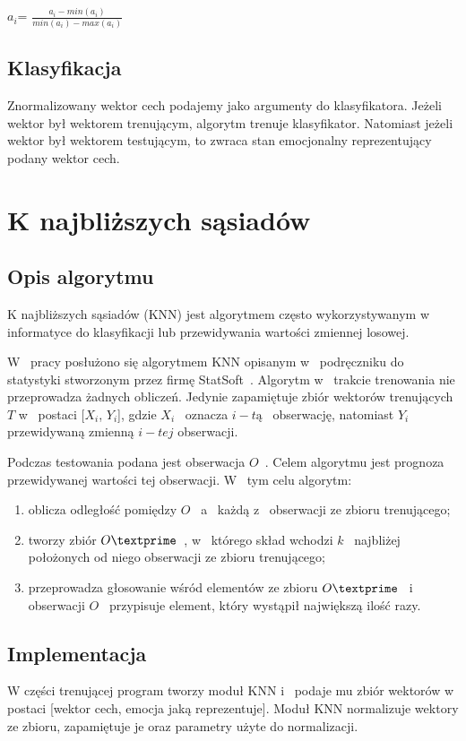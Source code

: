 \documentclass[declaration,shortabstract]{iithesis}
\begin{document}
$a_i$\textprime = $\frac{a_i - min(a_i)}{min(a_i) - max(a_i)}$

\section{Klasyfikacja}
Znormalizowany wektor cech podajemy jako argumenty do klasyfikatora. Jeżeli wektor był wektorem trenującym, algorytm trenuje klasyfikator. Natomiast jeżeli wektor był wektorem testującym, to zwraca stan emocjonalny reprezentujący podany wektor cech.

\chapter{K najbliższych sąsiadów}
\section{Opis algorytmu}
K najbliższych sąsiadów (KNN) jest algorytmem często wykorzystywanym w~ informatyce do klasyfikacji lub przewidywania wartości zmiennej losowej.  

W~ pracy posłużono się algorytmem KNN opisanym w~ podręczniku do statystyki stworzonym przez firmę StatSoft~\cite{KNN_opis}.
Algorytm w~ trakcie trenowania nie przeprowadza żadnych obliczeń. Jedynie zapamiętuje zbiór wektorów trenujących $T$ w~ postaci [$X_i$, $Y_i$], gdzie $X_i$~ oznacza $i-tą$~ obserwację, natomiast $Y_i$ przewidywaną zmienną $i-tej$ obserwacji.

Podczas testowania podana jest obserwacja $O$~. Celem algorytmu jest prognoza przewidywanej wartości tej obserwacji. W~ tym celu algorytm:
\begin{enumerate}
\item oblicza odległość pomiędzy $O$~ a~ każdą z~ obserwacji ze zbioru trenującego;
\item tworzy zbiór $O\textprime$~, w~ którego skład wchodzi $k$~ najbliżej położonych od niego obserwacji ze zbioru trenującego;
\item przeprowadza głosowanie wśród elementów ze zbioru $O\textprime$~ i~ obserwacji $O$~ przypisuje element, który wystąpił największą ilość razy.
\end{enumerate}

\section{Implementacja}
W części trenującej program tworzy moduł KNN i~ podaje mu zbiór wektorów w postaci [wektor cech, emocja jaką reprezentuje]. Moduł KNN normalizuje wektory ze zbioru, zapamiętuje je oraz parametry użyte do normalizacji.
\end{document}
